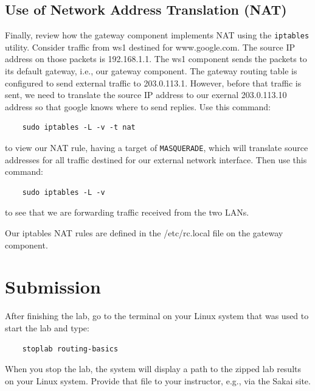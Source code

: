 \subsection{Use of Network Address Translation (NAT)}
Finally, review how the gateway component implements NAT using the \texttt{iptables} 
utility.  Consider traffic from ws1 destined for www.google.com. The source IP address
on those packets is 192.168.1.1.  The ws1 component sends the packets to its default
gateway, i.e., our gateway component.  The gateway routing table is configured to
send external traffic to 203.0.113.1.  However, before that traffic is sent, we need
to translate the source IP address to our exernal 203.0.113.10 address so that google knows
where to send replies.  
Use this command:
\begin{verbatim}
    sudo iptables -L -v -t nat
\end{verbatim}
\noindent to view our NAT rule, having a target of \texttt{MASQUERADE}, which will translate
source addresses for all traffic destined for our external network interface.  Then use 
this command:
\begin{verbatim}
    sudo iptables -L -v 
\end{verbatim}
\noindent to see that we are forwarding traffic received from the two LANs. 

Our iptables NAT rules are defined in the /etc/rc.local file on the gateway component.  

\section{Submission}
After finishing the lab, go to the terminal on your Linux system that was used to start the lab and type:
\begin{verbatim}
    stoplab routing-basics
\end{verbatim}
When you stop the lab, the system will display a path to the zipped lab results on your Linux system.  Provide that file to 
your instructor, e.g., via the Sakai site.


